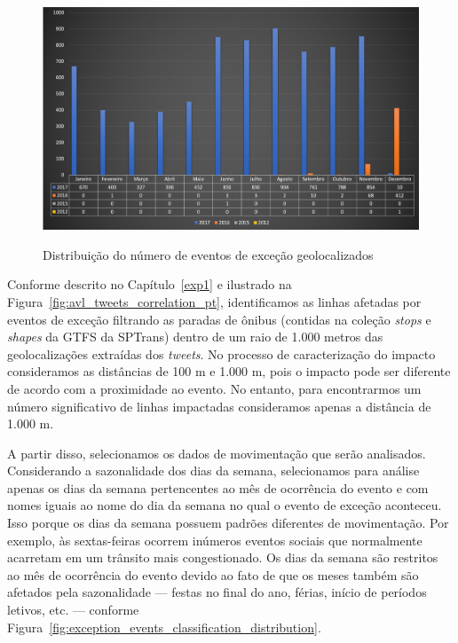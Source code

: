 \documentclass[
	12pt,				%
	oneside,			%
	a4paper,			%
	english,			%
	brazil				%
	]{abntex2ppgsi}
\begin{document}
{{\begin{figure}[!htb]
	\centering
 	  \caption{Distribuição do número de eventos de exceção geolocalizados}
		\includegraphics[width=1\linewidth]{images/geolocated_exception_events_distribution_pt.png}
	\label{fig:geolocated_exception_events_distribution}
\end{figure}

Conforme descrito no Capítulo~\ref{exp1} e ilustrado na Figura~\ref{fig:avl_tweets_correlation_pt}, identificamos as linhas afetadas por eventos de exceção filtrando as paradas de ônibus (contidas na coleção \textit{stops}  e \textit{shapes} da GTFS da SPTrans) dentro de um raio de 1.000 metros das geolocalizações extraídas dos \textit{tweets}. No processo de caracterização do impacto consideramos as distâncias de 100 m e 1.000 m, pois o impacto pode ser diferente de acordo com a proximidade ao evento. No entanto, para encontrarmos um número significativo de linhas impactadas consideramos apenas a distância de 1.000 m.

A partir disso, selecionamos os dados de movimentação que serão analisados. Considerando a sazonalidade dos dias da semana, selecionamos para análise apenas os dias da semana pertencentes ao mês de ocorrência do evento e com nomes iguais ao nome do dia da semana no qual o evento de exceção aconteceu. Isso porque os dias da semana possuem padrões diferentes de movimentação. Por exemplo, às sextas-feiras ocorrem inúmeros eventos sociais que normalmente acarretam em um trânsito mais congestionado. Os dias da semana são restritos ao mês de ocorrência do evento devido ao fato de que os meses também são afetados pela sazonalidade --- festas no final do ano, férias, início de períodos letivos, etc. --- conforme Figura~\ref{fig:exception_events_classification_distribution}.

}}
\end{document}
